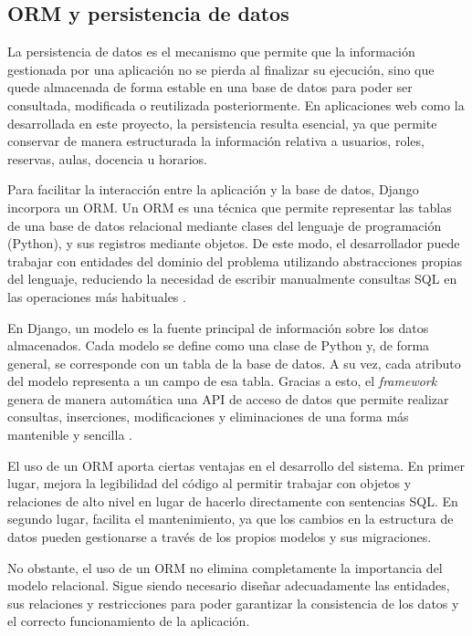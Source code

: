 \subsection{ORM y persistencia de datos}
La persistencia de datos es el mecanismo que permite que la información gestionada por una aplicación no se pierda al finalizar su ejecución, sino que quede almacenada de forma estable en una base de datos para poder ser consultada, modificada o reutilizada posteriormente. En aplicaciones web como la desarrollada en este proyecto, la persistencia resulta esencial, ya que permite conservar de manera estructurada la información relativa a usuarios, roles, reservas, aulas, docencia u horarios.

Para facilitar la interacción entre la aplicación y la base de datos, Django incorpora un ORM. Un ORM es una técnica que permite representar las tablas de una base de datos relacional mediante clases del lenguaje de programación (Python), y sus registros mediante objetos. De este modo, el desarrollador puede trabajar con entidades del dominio del problema utilizando abstracciones propias del lenguaje, reduciendo la necesidad de escribir manualmente consultas SQL en las operaciones más habituales \cite{orm-jorge,orm-urian}.

En Django, un modelo es la fuente principal de información sobre los datos almacenados. Cada modelo se define como una clase de Python y, de forma general, se corresponde con un tabla de la base de datos. A su vez, cada atributo del modelo representa a un campo de esa tabla. Gracias a esto, el \textit{framework} genera de manera automática una API de acceso de datos que permite realizar consultas, inserciones, modificaciones y eliminaciones de una forma más mantenible y sencilla \cite{orm-jorge,orm-urian}. 

El uso de un ORM aporta ciertas ventajas en el desarrollo del sistema. En primer lugar, mejora la legibilidad del código al permitir trabajar con objetos y relaciones de alto nivel en lugar de hacerlo directamente con sentencias SQL. En segundo lugar, facilita el mantenimiento, ya que los cambios en la estructura de datos pueden gestionarse a través de los propios modelos y sus migraciones.

No obstante, el uso de un ORM no elimina completamente la importancia del modelo relacional. Sigue siendo necesario diseñar adecuadamente las entidades, sus relaciones y restricciones para poder garantizar la consistencia de los datos y el correcto funcionamiento de la aplicación. 

